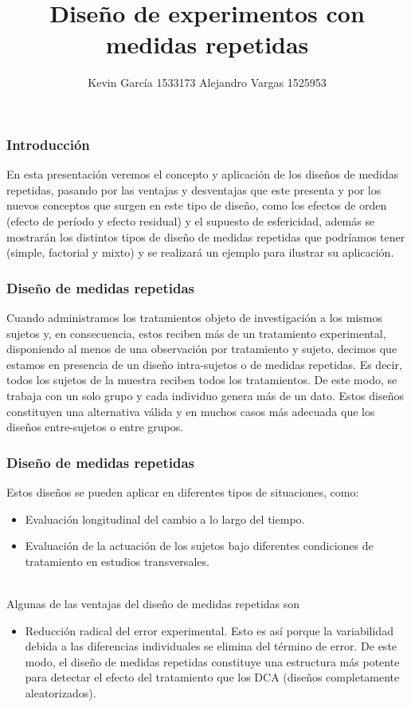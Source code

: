 \documentclass[12pt]{beamer}
\author[Kevin García - Alejandro Vargas]{Kevin García 1533173 \newline Alejandro Vargas 1525953}
\title[Diseños con medidas repetidas]{Diseño de experimentos con medidas repetidas}
\begin{document}
\justifying
\begin{frame}[plain]
\maketitle
\end{frame}


\begin{frame}
\frametitle{Introducción}
En esta presentación veremos el concepto y aplicación de los diseños de medidas repetidas, pasando por las ventajas y desventajas que este presenta y por los nuevos conceptos que surgen en este tipo de diseño, como los efectos de orden (efecto de período y efecto residual) y el supuesto de esfericidad, además se mostrarán los distintos tipos de diseño de medidas repetidas que podríamos tener (simple, factorial y mixto) y se realizará un ejemplo para ilustrar su aplicación. 
\end{frame}

\begin{frame}
\frametitle{Diseño de medidas repetidas}
Cuando administramos los tratamientos objeto de investigación a los mismos sujetos y, en
consecuencia, estos reciben más de un tratamiento experimental, disponiendo al menos de una
observación por tratamiento y sujeto, decimos que estamos en presencia de un diseño intra-sujetos
o de medidas repetidas. Es decir, todos los sujetos de la muestra reciben todos los tratamientos.
De este modo, se trabaja con un solo grupo y cada individuo genera más de un dato. Estos diseños
constituyen una alternativa válida y en muchos casos más adecuada que los diseños entre-sujetos
o entre grupos.
\end{frame}

\begin{frame}
\frametitle{Diseño de medidas repetidas}
Estos diseños se pueden aplicar en diferentes tipos de situaciones, como:
\begin{itemize}
\justifying
\item Evaluación longitudinal del cambio a lo largo del tiempo.
\item Evaluación de la actuación de los sujetos bajo diferentes condiciones de tratamiento en
estudios transversales.
\end{itemize}
~\\Algunas de las ventajas del diseño de medidas repetidas son
\begin{itemize}
\justifying
\item Reducción radical del error experimental. Esto es así porque la variabilidad debida a las
diferencias individuales se elimina del término de error. De este modo, el diseño de medidas
repetidas constituye una estructura más potente para detectar el efecto del tratamiento que los
DCA (diseños completamente aleatorizados).
\end{itemize}
\end{frame}
\end{document}
